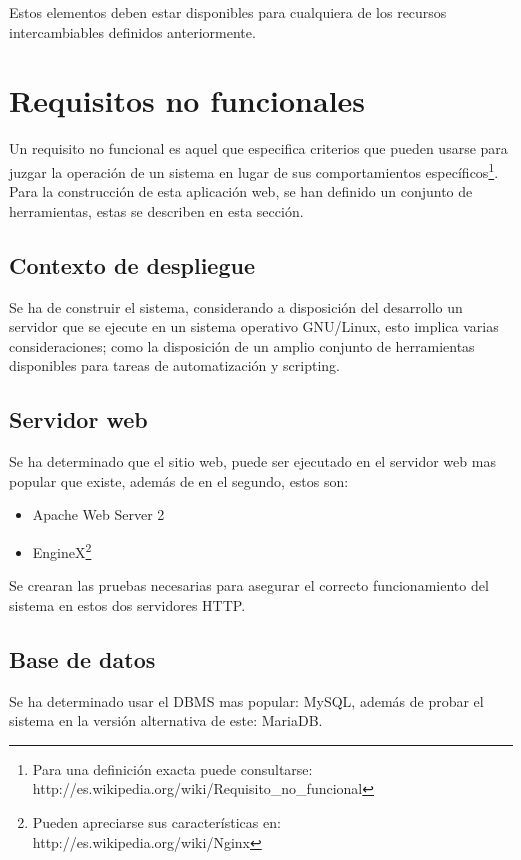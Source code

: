 Estos elementos deben estar disponibles para cualquiera de los recursos
intercambiables definidos anteriormente.

\section{Requisitos no funcionales}

Un requisito no funcional es aquel que especifica criterios que pueden usarse
para juzgar la operación de un sistema en lugar de sus comportamientos
específicos\footnote{Para una definición exacta puede consultarse:
http://es.wikipedia.org/wiki/Requisito\_no\_funcional}. Para la construcción de
esta aplicación web, se han definido un conjunto de herramientas, estas se
describen en esta sección.

\subsection{Contexto de despliegue}

Se ha de construir el sistema, considerando a disposición del desarrollo un
servidor que se ejecute en un sistema operativo GNU/Linux, esto implica varias
consideraciones; como la disposición de un amplio conjunto de
herramientas disponibles para tareas de automatización y scripting.

\subsection{Servidor web}

Se ha determinado que el sitio web, puede ser ejecutado en el servidor web mas
popular que existe, además de en el segundo, estos son:

\begin{itemize}
\item Apache Web Server 2
\item EngineX\footnote{Pueden apreciarse sus características en:
http://es.wikipedia.org/wiki/Nginx}
\end{itemize}

Se crearan las pruebas necesarias para asegurar el correcto funcionamiento del
sistema en estos dos servidores HTTP.

\subsection{Base de datos}

Se ha determinado usar el DBMS mas popular: MySQL, además de probar el sistema
en la versión alternativa de este: MariaDB.

